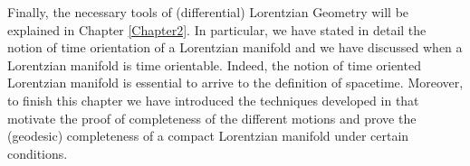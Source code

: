 \documentclass[11pt]{book}
\begin{document}

%
%
%

Finally, the necessary tools of (differential) Lorentzian Geometry will be explained in Chapter \ref{Chapter2}. In particular, we have stated in detail the notion of time orientation of a Lorentzian manifold and we have discussed when a Lorentzian manifold is time orientable. Indeed, the notion of time oriented Lorentzian manifold is essential to arrive to the definition of spacetime. Moreover, to finish this chapter we have introduced the techniques developed in \cite{RS} that motivate the proof of completeness of the different motions and prove  the (geodesic) completeness of a compact Lorentzian manifold under certain conditions.
\end{document}
